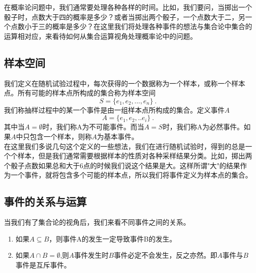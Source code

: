在概率论问题中，我们通常要处理各种各样的时间。比如，我们要问，当掷出一个骰子时，点数大于四的概率是多少？或者当掷出两个骰子，一个点数大于二，另一个点数小于三的概率是多少？在这里我们将处理各种事件的想法与集合论中集合的运算相对应，来看待如何从集合运算视角处理概率论中的问题。
\subsection{样本空间}
我们定义在随机试验过程中，每次获得的一个数据称为一个样本，或称一个样本点。所有可能的样本点所构成的集合称为样本空间
\begin{equation}
S = \{e_1,e_2,...,e_n\}~.
\end{equation}
我们称抽样过程中的某一个事件是由一组样本点所构成的集合。定义事件$A$
\begin{equation}
A = \{e_1,e_2,..e_i\}~.
\end{equation}
其中当$A= \emptyset $时，我们称A为不可能事件。而当$A=S$时，我们称A为必然事件。如果$A$中只包含一个样本，则称$A$为基本事件。\\
在这里我们多说几句这个定义的一些想法，我们在进行随机试验时，得到的总是一个个样本，但是我们通常需要根据样本的性质对各种采样结果分类。比如，掷出两个骰子点数如果总和大于6点的时候我们说这个结果是大。这样所谓"大"的结果作为一个事件，就将包含多个可能的样本点，所以我们将事件定义为样本点的集合。
\subsection{事件的关系与运算}
当我们有了集合论的视角后，我们来看不同事件之间的关系。
\begin{enumerate}
\item 如果$A\subseteq B$，则事件A的发生一定导致事件B的发生。
\item 如果$A \cap B = \emptyset$,则$A$事件发生时$B$事件必定不会发生，反之亦然。即$A$事件与$B$事件是互斥事件。
\end{enumerate}

